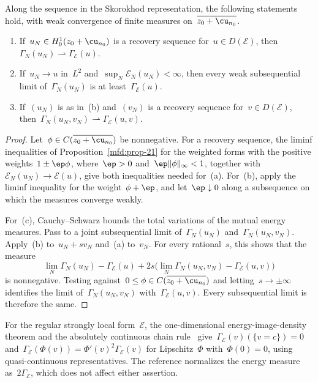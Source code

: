 \documentclass[11pt]{amsart}
\begin{document}
\smallskip

\begin{corollary}
\label{mfd:cor-energy-measures}
Along the sequence in the Skorokhod representation, the following statements hold, with weak convergence of finite measures on~$\overline{z_0+\cu_{n_0}}$.
\begin{enumerate}[label=(\alph*)]
\item If~$u_N\in H^1_0(z_0+\cu_{n_0})$ is a recovery sequence for~$u\in D(\mathscr E)$, then~$\Gamma_N(u_N)\rightharpoonup\Gamma_{\mathscr E}(u)$.
\item If~$u_N\to u$ in~$L^2$ and~$\sup_N\mathscr E_N(u_N)<\infty$, then every weak subsequential limit of~$\Gamma_N(u_N)$ is at least~$\Gamma_{\mathscr E}(u)$.
\item If~$(u_N)$ is as in~(b) and~$(v_N)$ is a recovery sequence for~$v\in D(\mathscr E)$, then~$\Gamma_N(u_N,v_N)\rightharpoonup\Gamma_{\mathscr E}(u,v)$.
\end{enumerate}
\end{corollary}

\begin{proof}
Let~$\phi\in C(\overline{z_0+\cu_{n_0}})$ be nonnegative. For a recovery sequence, the liminf inequalities of Proposition~\ref{mfd:prop-21} for the weighted forms with the positive weights~$1\pm\ep\phi$, where~$\ep>0$ and~$\ep\|\phi\|_\infty<1$, together with~$\mathscr E_N(u_N)\to \mathscr E(u)$, give both inequalities needed for~(a). For~(b), apply the liminf inequality for the weight~$\phi+\ep$, and let~$\ep\downarrow0$ along a subsequence on which the measures converge weakly.

\smallskip

For~(c), Cauchy--Schwarz bounds the total variations of the mutual energy measures. Pass to a joint subsequential limit of~$\Gamma_N(u_N)$ and~$\Gamma_N(u_N,v_N)$. Apply~(b) to~$u_N+sv_N$ and~(a) to~$v_N$. For every rational~$s$, this shows that the measure
\begin{equation*}
	\lim_N\Gamma_N(u_N)-\Gamma_{\mathscr E}(u)
	+2s\bigl(\lim_N\Gamma_N(u_N,v_N)-\Gamma_{\mathscr E}(u,v)\bigr)
\end{equation*}
is nonnegative. Testing against~$0\leq\phi\in C(\overline{z_0+\cu_{n_0}})$ and letting~$s\to\pm\infty$ identifies the limit of~$\Gamma_N(u_N,v_N)$ with~$\Gamma_{\mathscr E}(u,v)$. Every subsequential limit is therefore the same.
\end{proof}

For the regular strongly local form~$\mathscr E$, the one-dimensional energy-image-density theorem and the absolutely continuous chain rule~\citep[Proposition~1.16 and its proof]{Fitzsimmons2004} give~$\Gamma_{\mathscr E}(v)(\{v=c\})=0$ and~$\Gamma_{\mathscr E}(\Phi(v))=\Phi'(v)^2\Gamma_{\mathscr E}(v)$ for Lipschitz~$\Phi$ with~$\Phi(0)=0$, using quasi-continuous representatives. The reference normalizes the energy measure as~$2\Gamma_{\mathscr E}$, which does not affect either assertion.
\end{document}
